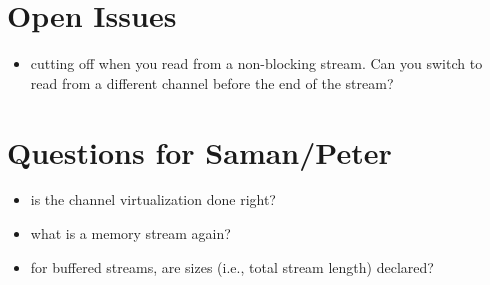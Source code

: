 \section{Open Issues}

\begin{itemize}

\item cutting off when you read from a non-blocking stream. Can you
    switch to read from a different channel before the end of the
    stream?

\end{itemize}

\section{Questions for Saman/Peter}

\begin{itemize}

\item is the channel virtualization done right?

\item what is a memory stream again?

\item for buffered streams, are sizes (i.e., total stream length)
declared?

\end{itemize}